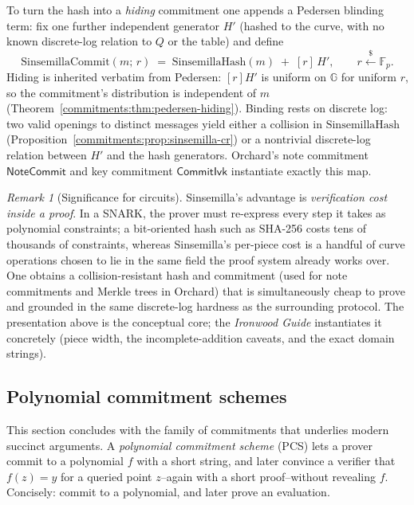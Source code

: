 \documentclass[11pt,a4paper]{article}
\theoremstyle{definition}
\theoremstyle{remark}
\newtheorem{remark}[theorem]{Remark}
\newcommand{\G}{\ensuremath{\mathbb{G}}}
\newcommand{\Fp}{\ensuremath{\mathbb{F}_{p}}}
\begin{document}
To turn the hash into a \emph{hiding} commitment one appends a Pedersen blinding term: fix one further independent generator \(H'\) (hashed to the curve, with no known discrete-log relation to \(Q\) or the table) and define
\[
  \mathrm{SinsemillaCommit}(m;\, r) \;=\; \mathrm{SinsemillaHash}(m) \;+\; [r]\,H',
  \qquad r \xleftarrow{\$} \Fp.
\]
Hiding is inherited verbatim from Pedersen: \([r]H'\) is uniform on \(\G\) for uniform \(r\), so the commitment's distribution is independent of \(m\) (Theorem~\ref{commitments:thm:pedersen-hiding}). Binding rests on discrete log: two valid openings to distinct messages yield either a collision in \(\mathrm{SinsemillaHash}\) (Proposition~\ref{commitments:prop:sinsemilla-cr}) or a nontrivial discrete-log relation between \(H'\) and the hash generators. Orchard's note commitment \(\mathsf{NoteCommit}\) and key commitment \(\mathsf{CommitIvk}\) instantiate exactly this map.

\begin{remark}[Significance for circuits]\label{commitments:rem:sinsemilla-circuit}
Sinsemilla's advantage is \emph{verification cost inside a proof}. In a SNARK, the prover must re-express every step it takes as polynomial constraints; a bit-oriented hash such as SHA-256 costs tens of thousands of constraints, whereas Sinsemilla's per-piece cost is a handful of curve operations chosen to lie in the same field the proof system already works over. One obtains a collision-resistant hash and commitment (used for note commitments and Merkle trees in Orchard) that is simultaneously cheap to prove and grounded in the same discrete-log hardness as the surrounding protocol. The presentation above is the conceptual core; the \emph{Ironwood Guide} instantiates it concretely (piece width, the incomplete-addition caveats, and the exact domain strings).
\end{remark}

\subsection{Polynomial commitment schemes}\label{commitments:subsec:poly}

This section concludes with the family of commitments that underlies modern succinct arguments. A \emph{polynomial commitment scheme} (PCS) lets a prover commit to a polynomial \(f\) with a short string, and later convince a verifier that \(f(z) = y\) for a queried point \(z\)--again with a short proof--without revealing \(f\). Concisely: commit to a polynomial, and later prove an evaluation.
\end{document}
